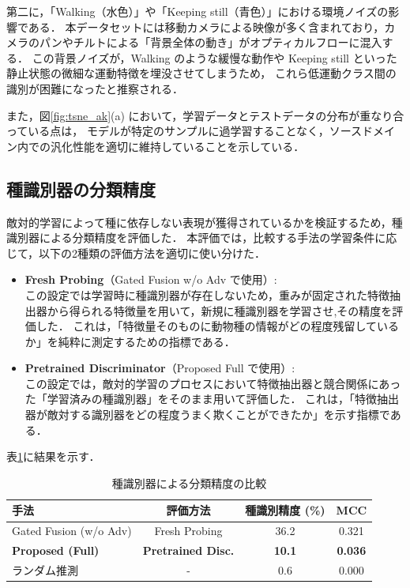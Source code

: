 第二に，「Walking（水色）」や「Keeping still（青色）」における環境ノイズの影響である．
本データセットには移動カメラによる映像が多く含まれており，カメラのパンやチルトによる「背景全体の動き」がオプティカルフローに混入する．
この背景ノイズが，Walking のような緩慢な動作や Keeping still といった静止状態の微細な運動特徴を埋没させてしまうため，
これら低運動クラス間の識別が困難になったと推察される．

また，図\ref{fig:tsne_ak}(a) において，学習データとテストデータの分布が重なり合っている点は，
モデルが特定のサンプルに過学習することなく，ソースドメイン内での汎化性能を適切に維持していることを示している．

\subsection{種識別器の分類精度}
敵対的学習によって種に依存しない表現が獲得されているかを検証するため，種識別器による分類精度を評価した．
本評価では，比較する手法の学習条件に応じて，以下の2種類の評価方法を適切に使い分けた．

\begin{itemize}
  \item \textbf{Fresh Probing}（Gated Fusion w/o Adv で使用）: \\
  この設定では学習時に種識別器が存在しないため，重みが固定された特徴抽出器から得られる特徴量を用いて，新規に種識別器を学習させ,その精度を評価した．
  これは，「特徴量そのものに動物種の情報がどの程度残留しているか」を純粋に測定するための指標である．

  \item \textbf{Pretrained Discriminator}（Proposed Full で使用）: \\
  この設定では，敵対的学習のプロセスにおいて特徴抽出器と競合関係にあった「学習済みの種識別器」をそのまま用いて評価した．
  これは，「特徴抽出器が敵対する識別器をどの程度うまく欺くことができたか」を示す指標である．
\end{itemize}

表\ref{tab:species_acc}に結果を示す．

\begin{table}[t]
  \centering
  \caption{種識別器による分類精度の比較}
  \label{tab:species_acc}
  \begin{tabular}{lccc}
    \hline
    手法 & 評価方法 & 種識別精度 (\%) & MCC \\
    \hline \hline
    Gated Fusion (w/o Adv) & Fresh Probing & 36.2 & 0.321 \\
    \textbf{Proposed (Full)} & \textbf{Pretrained Disc.} & \textbf{10.1} & \textbf{0.036} \\
    \hline
    ランダム推測 & - & 0.6 & 0.000 \\
    \hline
  \end{tabular}
\end{table}

